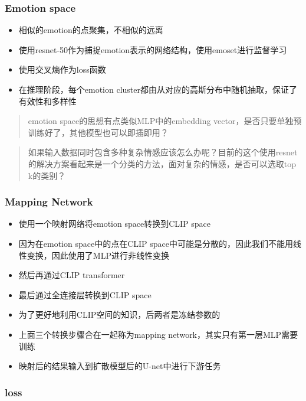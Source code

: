 \documentclass[
]{article}
\providecommand{\tightlist}{%
  \setlength{\itemsep}{0pt}\setlength{\parskip}{0pt}}
\begin{document}
\hypertarget{emotion-space}{%
\subsubsection{Emotion space}\label{emotion-space}}

\begin{itemize}
\tightlist
\item
  相似的emotion的点聚集，不相似的远离
\item
  使用resnet-50作为捕捉emotion表示的网络结构，使用emoset进行监督学习
\item
  使用交叉熵作为loss函数{}
\item
  在推理阶段，每个emotion
  cluster都由从对应的高斯分布中随机抽取，保证了有效性和多样性
\end{itemize}

\begin{quote}
emotion space的思想有点类似MLP中的embedding
vector，是否只要单独预训练好了，其他模型也可以即插即用？
\end{quote}

\begin{quote}
如果输入数据同时包含多种复杂情感应该怎么办呢？目前的这个使用resnet的解决方案看起来是一个分类的方法，面对复杂的情感，是否可以选取top
k的类别？
\end{quote}

\hypertarget{mapping-network}{%
\subsubsection{Mapping Network}\label{mapping-network}}

\begin{itemize}
\tightlist
\item
  使用一个映射网络将emotion space转换到CLIP space
\item
  因为在emotion space中的点在CLIP
  space中可能是分散的，因此我们不能用线性变换，因此使用了MLP进行非线性变换
\item
  然后再通过CLIP transformer
\item
  最后通过全连接层转换到CLIP space
\item
  为了更好地利用CLIP空间的知识，后两者是冻结参数的
\item
  上面三个转换步骤合在一起称为mapping network，其实只有第一层MLP需要训练
\item
  映射后的结果输入到扩散模型后的U-net中进行下游任务
\end{itemize}

\hypertarget{loss}{%
\subsubsection{loss}\label{loss}}
\end{document}
